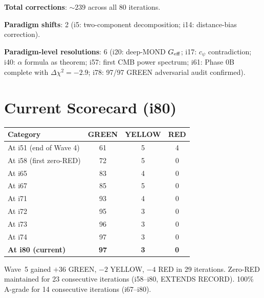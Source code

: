 \documentclass[11pt,a4paper]{article}
\begin{document}
\textbf{Total corrections}: $\sim 239$ across all 80 iterations.

\textbf{Paradigm shifts}: 2 (i5: two-component decomposition; i14: distance-bias correction).

\textbf{Paradigm-level resolutions}: 6 (i20: deep-MOND $G_{\rm eff}$; i17: $c_\psi$ contradiction; i40: $\alpha$ formula as theorem; i57: first CMB power spectrum; i61: Phase 0B complete with $\Delta\chi^2 = -2.9$; i78: 97/97 GREEN adversarial audit confirmed).

\section{Current Scorecard (i80)}

\begin{center}
\begin{tabular}{lccc}
\toprule
\textbf{Category} & \textbf{GREEN} & \textbf{YELLOW} & \textbf{RED} \\
\midrule
At i51 (end of Wave 4) & 61 & 5 & 4 \\
At i58 (first zero-RED) & 72 & 5 & 0 \\
At i65 & 83 & 4 & 0 \\
At i67 & 85 & 5 & 0 \\
At i71 & 93 & 4 & 0 \\
At i72 & 95 & 3 & 0 \\
At i73 & 96 & 3 & 0 \\
At i74 & 97 & 3 & 0 \\
\textbf{At i80 (current)} & \textbf{97} & \textbf{3} & \textbf{0} \\
\bottomrule
\end{tabular}
\end{center}

\noindent
Wave~5 gained $+36$ GREEN, $-2$ YELLOW, $-4$ RED in 29 iterations.
Zero-RED maintained for 23 consecutive iterations (i58--i80, EXTENDS RECORD).
100\% A-grade for 14 consecutive iterations (i67--i80).
\end{document}
